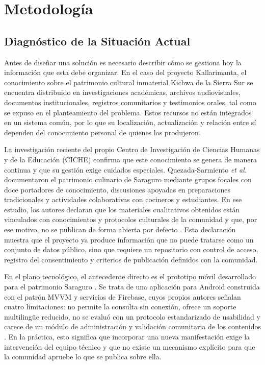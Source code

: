 \chapter{Metodología}
\label{chap:metodologia}

\section{Diagnóstico de la Situación Actual}
Antes de diseñar una solución es necesario describir cómo se gestiona hoy la información que esta debe organizar. En el caso del proyecto Kallarimanta, el conocimiento sobre el patrimonio cultural inmaterial Kichwa de la Sierra Sur se encuentra distribuido en investigaciones académicas, archivos audiovisuales, documentos institucionales, registros comunitarios y testimonios orales, tal como se expuso en el planteamiento del problema. Estos recursos no están integrados en un sistema común, por lo que su localización, actualización y relación entre sí dependen del conocimiento personal de quienes los produjeron.

La investigación reciente del propio Centro de Investigación de Ciencias Humanas y de la Educación (CICHE) confirma que este conocimiento se genera de manera continua y que su gestión exige cuidados especiales. Quezada-Sarmiento \textit{et al.} \cite{quezada2026culinary} documentaron el patrimonio culinario de Saraguro mediante grupos focales con doce portadores de conocimiento, discusiones apoyadas en preparaciones tradicionales y actividades colaborativas con cocineros y estudiantes. En ese estudio, los autores declaran que los materiales cualitativos obtenidos están vinculados con conocimientos y protocolos culturales de la comunidad y que, por ese motivo, no se publican de forma abierta por defecto \cite{quezada2026culinary}. Esta declaración muestra que el proyecto ya produce información que no puede tratarse como un conjunto de datos público, sino que requiere un repositorio con control de acceso, registro del consentimiento y criterios de publicación definidos con la comunidad.

En el plano tecnológico, el antecedente directo es el prototipo móvil desarrollado para el patrimonio Saraguro \cite{quezada2026mobile}. Se trata de una aplicación para Android construida con el patrón MVVM y servicios de Firebase, cuyos propios autores señalan cuatro limitaciones: no permite la consulta sin conexión, ofrece un soporte multilingüe reducido, no se evaluó con un protocolo estandarizado de usabilidad y carece de un módulo de administración y validación comunitaria de los contenidos \cite{quezada2026mobile}. En la práctica, esto significa que incorporar una nueva manifestación exige la intervención del equipo técnico y que no existe un mecanismo explícito para que la comunidad apruebe lo que se publica sobre ella.

